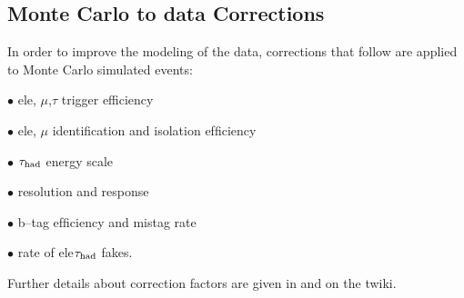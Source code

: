\subsection{Monte Carlo to data Corrections}
\label{sec:scaleFactors}
In order to improve the modeling of the data, corrections that follow are
 applied  to Monte Carlo simulated events:

$\bullet$ ele, $\mu$,$\tau$ trigger efficiency

$\bullet$ ele, $\mu$ identiﬁcation and isolation efﬁciency

$\bullet$ $\tau_{\rm had}$ energy scale

$\bullet$ \MET resolution and response

$\bullet$ b–tag efﬁciency and mistag rate

$\bullet$ rate of ele\rightarrow $\tau_{\rm had}$  fakes.

Further details about correction factors  are given in \cite{CMS_AN_2013-171} and on the twiki\cite{HiggsTauTaugroup}.
